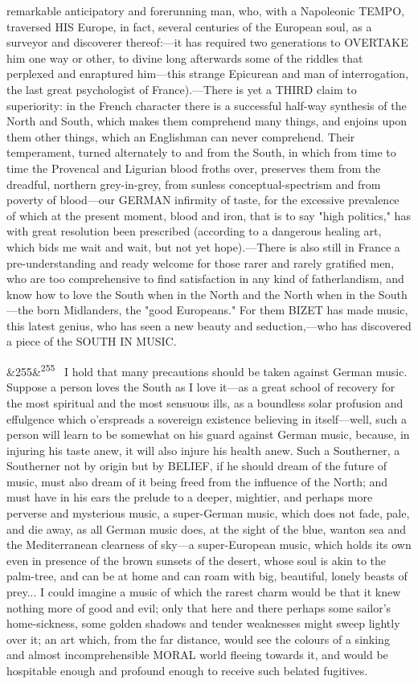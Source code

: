 \documentclass[12pt]{article}
\newcommand{\para}[1][]{\par\noindent\ifx&#1&\else\textsuperscript{\footnotesize #1}~\fi}
\begin{document}
remarkable anticipatory and forerunning man, who, with a Napoleonic TEMPO, traversed HIS Europe, in fact, several centuries of the European soul, as a surveyor and discoverer thereof:---it has required two generations to OVERTAKE him one way or other, to divine long afterwards some of the riddles that perplexed and enraptured him---this strange Epicurean and man of interrogation, the last great psychologist of France).---There is yet a THIRD claim to superiority: in the French character there is a successful half-way synthesis of the North and South, which makes them comprehend many things, and enjoins upon them other things, which an Englishman can never comprehend. Their temperament, turned alternately to and from the South, in which from time to time the Provencal and Ligurian blood froths over, preserves them from the dreadful, northern grey-in-grey, from sunless conceptual-spectrism and from poverty of blood---our GERMAN infirmity of taste, for the excessive prevalence of which at the present moment, blood and iron, that is to say "high politics," has with great resolution been prescribed (according to a dangerous healing art, which bids me wait and wait, but not yet hope).---There is also still in France a pre-understanding and ready welcome for those rarer and rarely gratified men, who are too comprehensive to find satisfaction in any kind of fatherlandism, and know how to love the South when in the North and the North when in the South---the born Midlanders, the "good Europeans." For them BIZET has made music, this latest genius, who has seen a new beauty and seduction,---who has discovered a piece of the SOUTH IN MUSIC.

\para[255] I hold that many precautions should be taken against German music. Suppose a person loves the South as I love it---as a great school of recovery for the most spiritual and the most sensuous ills, as a boundless solar profusion and effulgence which o'erspreads a sovereign existence believing in itself---well, such a person will learn to be somewhat on his guard against German music, because, in injuring his taste anew, it will also injure his health anew. Such a Southerner, a Southerner not by origin but by BELIEF, if he should dream of the future of music, must also dream of it being freed from the influence of the North; and must have in his ears the prelude to a deeper, mightier, and perhaps more perverse and mysterious music, a super-German music, which does not fade, pale, and die away, as all German music does, at the sight of the blue, wanton sea and the Mediterranean clearness of sky---a super-European music, which holds its own even in presence of the brown sunsets of the desert, whose soul is akin to the palm-tree, and can be at home and can roam with big, beautiful, lonely beasts of prey... I could imagine a music of which the rarest charm would be that it knew nothing more of good and evil; only that here and there perhaps some sailor's home-sickness, some golden shadows and tender weaknesses might sweep lightly over it; an art which, from the far distance, would see the colours of a sinking and almost incomprehensible MORAL world fleeing towards it, and would be hospitable enough and profound enough to receive such belated fugitives.
\end{document}
